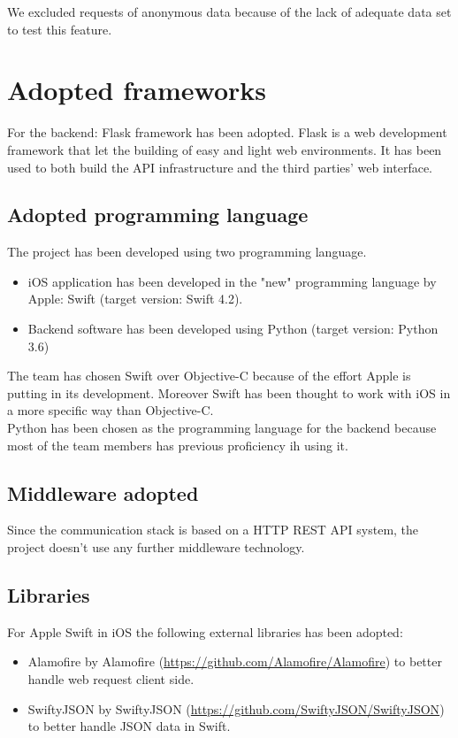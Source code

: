 \documentclass{article}
\begin{document}
We excluded requests of anonymous data because of the lack of adequate data set to test this feature.

\section{Adopted frameworks}
For the backend: Flask framework has been adopted. Flask is a web development framework that let the building of easy and light web environments. It has been used to both build the API infrastructure and the third parties' web interface.
\subsection{Adopted programming language}

The project has been developed using two programming language. 

\begin{itemize}
	\item iOS application has been developed in the "new" programming language by Apple: Swift (target version: Swift 4.2).
	\item  Backend software has been developed using Python (target version: Python 3.6)
\end{itemize}

The team has chosen Swift over Objective-C because of the effort Apple is putting in its development. Moreover Swift has been thought to work with iOS in a more specific way than Objective-C.\\
Python has been chosen as the programming language for the backend because most of the team members has previous proficiency ih using it.

\subsection{Middleware adopted}
Since the communication stack is based on a HTTP REST API system, the project doesn't use any further middleware technology.

\subsection{Libraries}
For Apple Swift in iOS the following external libraries has been adopted:
\begin{itemize}
	\item Alamofire by Alamofire (\url{https://github.com/Alamofire/Alamofire}) to better handle web request client side.
	\item SwiftyJSON by SwiftyJSON (\url{https://github.com/SwiftyJSON/SwiftyJSON}) to better handle JSON data in Swift.
\end{itemize}
\end{document}
